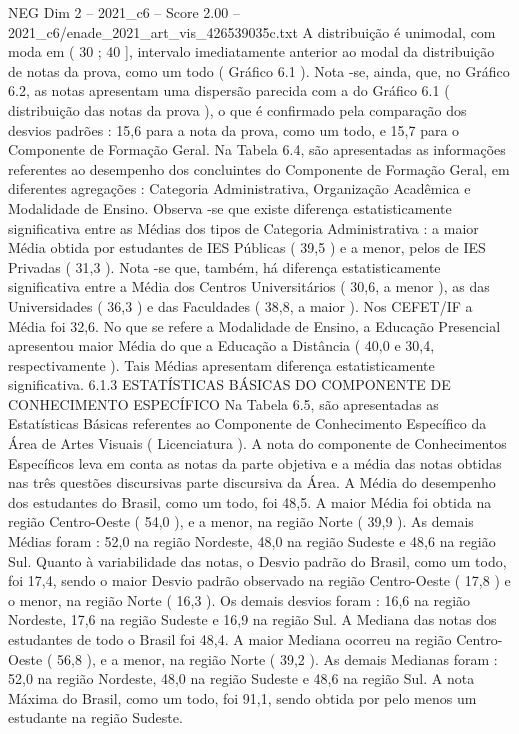 \begin{textsample}{NEG Dim 2 – 2021\_c6 – Score 2.00 – 2021\_c6/enade\_2021\_art\_vis\_426539035c.txt}
A distribuição é unimodal, com moda em ( 30 ; 40 ], intervalo imediatamente anterior ao modal da distribuição de notas da prova, como um todo ( Gráfico 6.1 ).
Nota -se, ainda, que, no Gráfico 6.2, as notas apresentam uma dispersão parecida com a do Gráfico 6.1 ( distribuição das notas da prova ), o que é confirmado pela comparação dos desvios padrões : 15,6 para a nota da prova, como um todo, e 15,7 para o Componente de Formação Geral.
Na Tabela 6.4, são apresentadas as informações referentes ao desempenho dos concluintes do Componente de Formação Geral, em diferentes agregações : Categoria Administrativa, Organização Acadêmica e Modalidade de Ensino.
Observa -se que existe diferença estatisticamente significativa entre as Médias dos tipos de Categoria Administrativa : a maior Média obtida por estudantes de IES Públicas ( 39,5 ) e a menor, pelos de IES Privadas ( 31,3 ).
Nota -se que, também, há diferença estatisticamente significativa entre a Média dos Centros Universitários ( 30,6, a menor ), as das Universidades ( 36,3 ) e das Faculdades ( 38,8, a maior ).
Nos CEFET/IF a Média foi 32,6.
No que se refere a Modalidade de Ensino, a Educação Presencial apresentou maior Média do que a Educação a Distância ( 40,0 e 30,4, respectivamente ).
Tais Médias apresentam diferença estatisticamente significativa. 6.1.3 ESTATÍSTICAS BÁSICAS DO COMPONENTE DE CONHECIMENTO ESPECÍFICO Na Tabela 6.5, são apresentadas as Estatísticas Básicas referentes ao Componente de Conhecimento Específico da Área de Artes Visuais ( Licenciatura ).
A nota do componente de Conhecimentos Específicos leva em conta as notas da parte objetiva e a média das notas obtidas nas três questões discursivas parte discursiva da Área.
A Média do desempenho dos estudantes do Brasil, como um todo, foi 48,5.
A maior Média foi obtida na região Centro-Oeste ( 54,0 ), e a menor, na região Norte ( 39,9 ).
As demais Médias foram : 52,0 na região Nordeste, 48,0 na região Sudeste e 48,6 na região Sul.
Quanto à variabilidade das notas, o Desvio padrão do Brasil, como um todo, foi 17,4, sendo o maior Desvio padrão observado na região Centro-Oeste ( 17,8 ) e o menor, na região Norte ( 16,3 ).
Os demais desvios foram : 16,6 na região Nordeste, 17,6 na região Sudeste e 16,9 na região Sul.
A Mediana das notas dos estudantes de todo o Brasil foi 48,4.
A maior Mediana ocorreu na região Centro-Oeste ( 56,8 ), e a menor, na região Norte ( 39,2 ).
As demais Medianas foram : 52,0 na região Nordeste, 48,0 na região Sudeste e 48,6 na região Sul.
A nota Máxima do Brasil, como um todo, foi 91,1, sendo obtida por pelo menos um estudante na região Sudeste.

\end{textsample}
